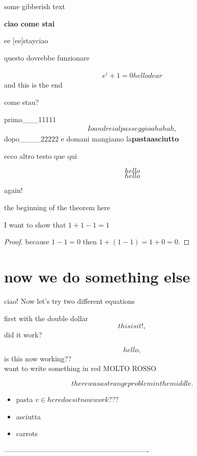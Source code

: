 
some gibberish text

\textbf{ciao come stai}

 ee
[ee]{stay}ciao

questo dovrebbe funzionare

\begin{align*}
e^i+1=0 hello dear
\end{align*}
and this is the end

come stau?

prima___11111
\begin{align}
Io andrei al passeggio ahahah,
\end{align}
dopo____22222
e domani mangiamo la\textbf{pastaasciutto}

ecco altro testo que {qui}


\begin{equation} hello \end{equation}
\begin{equation*} hello \end{equation*}

again! \centering

the beginning of the theorem {\Large here}
\begin{theorem}
I want to show that $1+1-1 = 1$
\end{theorem}
\begin{proof}
because $1-1=0$ then $1+(1-1)=1+0=0.$
\end{proof}

\section*{now we do something else}

ciao! Now let's try {\small two different equations}

first with the double dollar
$$
this is it!,
$$
did it work?

\[ hello, \] is this now working?? \\ want to write something in red {\color{red} MOLTO ROSSO }

\[
there was a strange problem in the middle.    
\]

\begin{itemize}

\item pasta $v \in here does it now work???$
\item asciutta

\item carrots
\end{itemize}

-------------------------------------------------------------


